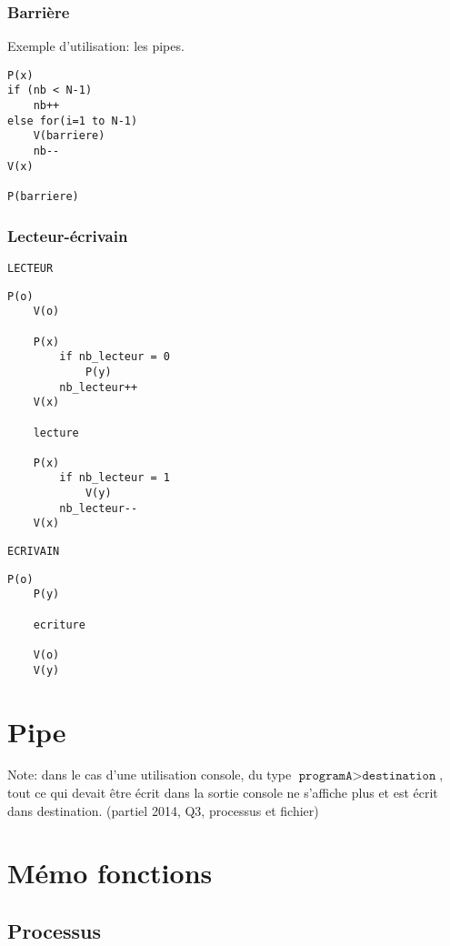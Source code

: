 \documentclass[10pt,twocolumn,a4paper]{article}
\begin{document}
\subsubsection{Barrière}

Exemple d'utilisation: les pipes.

\begin{lstlisting}[xleftmargin=1cm,frame=shadowbox]
P(x)
if (nb < N-1)
    nb++
else for(i=1 to N-1) 
    V(barriere)
    nb--
V(x)

P(barriere)
\end{lstlisting}

\subsubsection{Lecteur-\'ecrivain}

\texttt{LECTEUR}
\begin{lstlisting}[frame=shadowbox,xrightmargin=1cm]
    P(o)
    V(o)

    P(x)
        if nb_lecteur = 0
            P(y)
        nb_lecteur++
    V(x)

    lecture

    P(x)
        if nb_lecteur = 1
            V(y)
        nb_lecteur--
    V(x)
\end{lstlisting}

\texttt{ECRIVAIN}
\begin{lstlisting}[frame=shadowbox,xrightmargin=1cm]
    P(o)
    P(y)

    ecriture

    V(o)
    V(y)
\end{lstlisting}

\section{Pipe}

Note: dans le cas d'une utilisation console, du type $\texttt{programA} > \texttt{destination}$, tout ce qui devait être écrit dans la sortie console ne s'affiche plus et est écrit dans destination. (partiel 2014, Q3, processus et fichier)


\section{Mémo fonctions}

\subsection{Processus}
\end{document}
